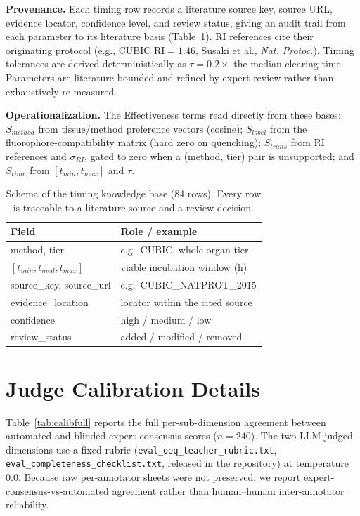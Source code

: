 \documentclass[conference]{IEEEtran}
\begin{document}
\noindent\textbf{Provenance.} Each timing row records a literature source key,
source URL, evidence locator, confidence level, and review status, giving an
audit trail from each parameter to its literature basis (Table~\ref{tab:kbprov}).
RI references cite their originating protocol (e.g., CUBIC RI${=}1.46$, Susaki
et al., \emph{Nat. Protoc.}). Timing tolerances are derived deterministically as
$\tau{=}0.2\times$ the median clearing time. Parameters are literature-bounded
and refined by expert review rather than exhaustively re-measured.

\noindent\textbf{Operationalization.} The Effectiveness terms read directly from
these bases: $S_{method}$ from tissue/method preference vectors (cosine);
$S_{label}$ from the fluorophore-compatibility matrix (hard zero on quenching);
$S_{trans}$ from RI references and $\sigma_{RI}$, gated to zero when a (method,
tier) pair is unsupported; and $S_{time}$ from $[t_{min},t_{max}]$ and $\tau$.

\begin{table}[htbp]
    \centering
    \caption{Schema of the timing knowledge base (84 rows). Every row is
    traceable to a literature source and a review decision.}
    \label{tab:kbprov}
    \small
    \begin{tabular}{l l}
        \toprule
        \textbf{Field} & \textbf{Role / example} \\
        \midrule
        method, tier & e.g.\ CUBIC, whole-organ tier \\
        $[t_{min}, t_{med}, t_{max}]$ & viable incubation window (h) \\
        source\_key, source\_url & e.g.\ CUBIC\_NATPROT\_2015 \\
        evidence\_location & locator within the cited source \\
        confidence & high / medium / low \\
        review\_status & added / modified / removed \\
        \bottomrule
    \end{tabular}
\end{table}

\section{Judge Calibration Details}\label{app:judge}
Table~\ref{tab:calibfull} reports the full per-sub-dimension agreement between
automated and blinded expert-consensus scores ($n{=}240$). The two LLM-judged
dimensions use a fixed rubric (\texttt{eval\_oeq\_teacher\_rubric.txt},
\texttt{eval\_completeness\_checklist.txt}, released in the repository) at
temperature $0.0$. Because raw per-annotator sheets were not preserved, we report
expert-consensus-vs-automated agreement rather than human--human inter-annotator
reliability.
\end{document}
